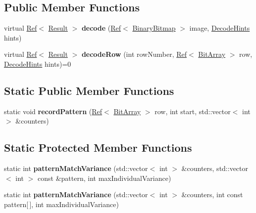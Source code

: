 \subsection*{Public Member Functions}
\begin{DoxyCompactItemize}
\item 
\mbox{\label{classzxing_1_1oned_1_1_one_d_reader_a1e4fbadd302963652b9cc59dd541c934}} 
virtual \mbox{\hyperlink{classzxing_1_1_ref}{Ref}}$<$ \mbox{\hyperlink{classzxing_1_1_result}{Result}} $>$ {\bfseries decode} (\mbox{\hyperlink{classzxing_1_1_ref}{Ref}}$<$ \mbox{\hyperlink{classzxing_1_1_binary_bitmap}{Binary\+Bitmap}} $>$ image, \mbox{\hyperlink{classzxing_1_1_decode_hints}{Decode\+Hints}} hints)
\item 
\mbox{\label{classzxing_1_1oned_1_1_one_d_reader_ae78199f4314c9040e4620735d68e7751}} 
virtual \mbox{\hyperlink{classzxing_1_1_ref}{Ref}}$<$ \mbox{\hyperlink{classzxing_1_1_result}{Result}} $>$ {\bfseries decode\+Row} (int row\+Number, \mbox{\hyperlink{classzxing_1_1_ref}{Ref}}$<$ \mbox{\hyperlink{classzxing_1_1_bit_array}{Bit\+Array}} $>$ row, \mbox{\hyperlink{classzxing_1_1_decode_hints}{Decode\+Hints}} hints)=0
\end{DoxyCompactItemize}
\subsection*{Static Public Member Functions}
\begin{DoxyCompactItemize}
\item 
\mbox{\label{classzxing_1_1oned_1_1_one_d_reader_a07b7ff2108e166bcad370b4f669601b3}} 
static void {\bfseries record\+Pattern} (\mbox{\hyperlink{classzxing_1_1_ref}{Ref}}$<$ \mbox{\hyperlink{classzxing_1_1_bit_array}{Bit\+Array}} $>$ row, int start, std\+::vector$<$ int $>$ \&counters)
\end{DoxyCompactItemize}
\subsection*{Static Protected Member Functions}
\begin{DoxyCompactItemize}
\item 
\mbox{\label{classzxing_1_1oned_1_1_one_d_reader_a61da2c26044d888f638d1ca2ab702c2d}} 
static int {\bfseries pattern\+Match\+Variance} (std\+::vector$<$ int $>$ \&counters, std\+::vector$<$ int $>$ const \&pattern, int max\+Individual\+Variance)
\item 
\mbox{\label{classzxing_1_1oned_1_1_one_d_reader_ab71f64dacd8a8f50c6ba85ccb389dbb3}} 
static int {\bfseries pattern\+Match\+Variance} (std\+::vector$<$ int $>$ \&counters, int const pattern\mbox{[}$\,$\mbox{]}, int max\+Individual\+Variance)
\end{DoxyCompactItemize}
